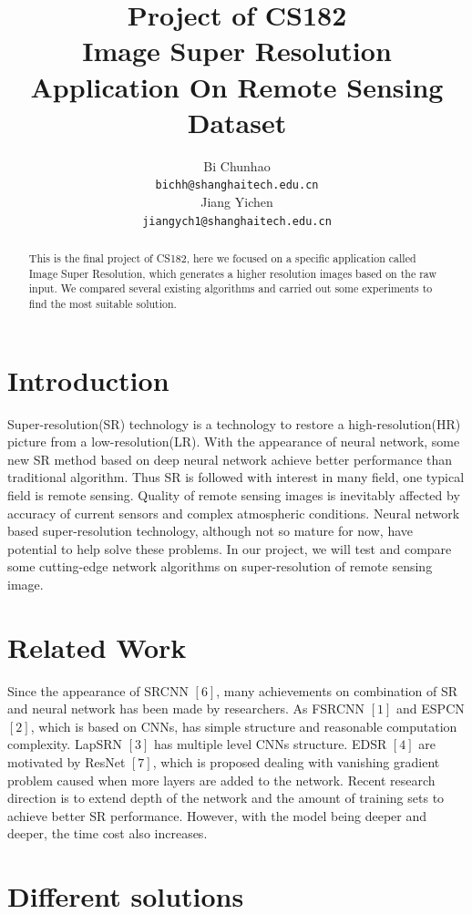 \documentclass{article}
\title{Project of CS182 \\ 
    Image Super Resolution \\
    Application On Remote Sensing Dataset}
\author{
    Bi Chunhao \\
    \texttt{bichh@shanghaitech.edu.cn} \\
    \And
    Jiang Yichen \\
    \texttt{jiangych1@shanghaitech.edu.cn} \\
}
\begin{document}
\maketitle

\begin{abstract}
    This is the final project of CS182, here we focused on a specific application called Image Super Resolution,
    which generates a higher resolution images based on the raw input. 
    We compared several existing algorithms and carried out some experiments to find the most suitable solution.
\end{abstract}

\section{Introduction}
Super-resolution(SR) technology is a technology to restore a high-resolution(HR) picture from a low-resolution(LR). 
With the appearance of neural network, some new SR method based on deep neural network achieve better performance than traditional algorithm. 
Thus SR is followed with interest in many field, one typical field is remote sensing. 
Quality of remote sensing images is inevitably affected by accuracy of current sensors and complex atmospheric conditions. 
Neural network based super-resolution technology, although not so mature for now, have potential to help solve these problems. 
In our project, we will test and compare some cutting-edge network algorithms on super-resolution of remote sensing image. 
  
\section{Related Work}
  Since the appearance of SRCNN $[6]$, many achievements on combination of SR and neural network has been made by researchers. 
  As FSRCNN $[1]$ and ESPCN $[2]$, which is based on CNNs, has simple structure and reasonable computation complexity. 
  LapSRN $[3]$ has multiple level CNNs structure. 
  EDSR $[4]$ are motivated by ResNet $[7]$, which is proposed dealing with vanishing gradient problem caused when more layers are added to the network.
  Recent research direction is to extend depth of the network and the amount of training sets to achieve better SR performance.
  However, with the model being deeper and deeper, the time cost also increases.
  
  \section{Different solutions} 
\end{document}
